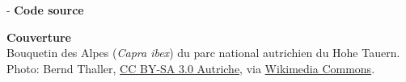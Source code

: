\begin{adjustwidth*}{\unitlength}{-\unitlength}
  \textbf{Code source} \\
  \viewsource{\ghurl}

  \textbf{Couverture} \\
  Bouquetin des Alpes (\emph{Capra ibex}) du parc national autrichien du Hohe Tauern.
  Photo: {\textcopyright} Bernd Thaller,
  \href{https://creativecommons.org/licenses/by-sa/3.0/at/deed.en}{CC
    BY-SA 3.0 Autriche}, via
  \href{https://commons.wikimedia.org/w/index.php?curid=40071439}{Wikimedia
    Commons}.
\end{adjustwidth*}
\endgroup

